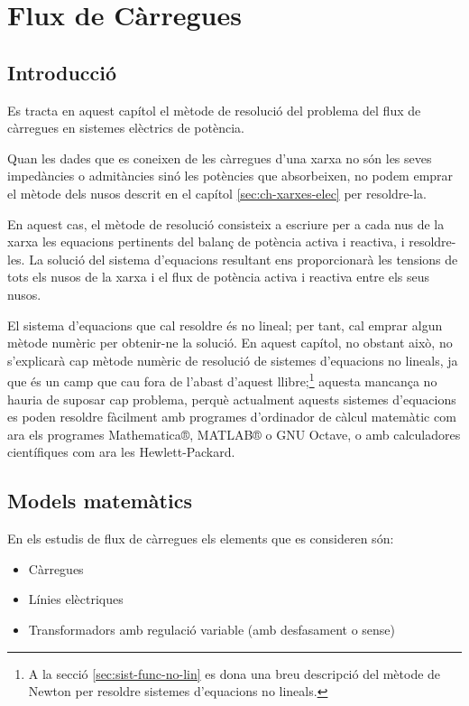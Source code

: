 
\chapter{Flux de Càrregues}
\label{sec:ch-flux-carregues}

\section{Introducció}

Es tracta en aquest capítol el mètode de resolució del problema del flux de càrregues en
sistemes elèctrics de potència.

Quan les dades que es coneixen de les càrregues d'una xarxa no són
les seves impedàncies o admitàncies sinó les potències que
absorbeixen, no podem emprar el mètode dels nusos descrit en el
capítol \ref{sec:ch-xarxes-elec} per  resoldre-la.

En aquest cas, el mètode de resolució consisteix a escriure per a cada
nus de la xarxa les equacions pertinents del balanç de potència activa i
reactiva, i resoldre-les. La solució del sistema d'equacions
resultant ens proporcionarà les tensions de tots els nusos de la
xarxa i el flux de potència activa i reactiva entre els seus nusos.

El sistema d'equacions que cal resoldre és no lineal;  per tant,
cal emprar algun mètode numèric per obtenir-ne la solució. En aquest capítol, no obstant això, no
s'explicarà cap mètode numèric de resolució de sistemes d'equacions
no lineals, ja que és un camp que cau fora de l'abast d'aquest llibre;\footnote{A la secció \ref{sec:sist-func-no-lin} es dona una breu descripció del mètode de Newton per resoldre sistemes d'equacions no lineals.} aquesta mancança  no hauria de suposar cap problema, perquè actualment aquests
sistemes d'equacions es poden resoldre fàcilment amb programes
d'ordinador de càlcul matemàtic com ara els programes
Mathematica®, MATLAB® o GNU Octave, o amb calculadores
científiques com ara les Hewlett-Packard.

\section{Models matemàtics} 

En els estudis de flux de càrregues els elements que es consideren són:
\begin{itemize}
   \item Càrregues
   \item Línies elèctriques
   \item Transformadors amb regulació variable (amb desfasament o sense)
\end{itemize}

